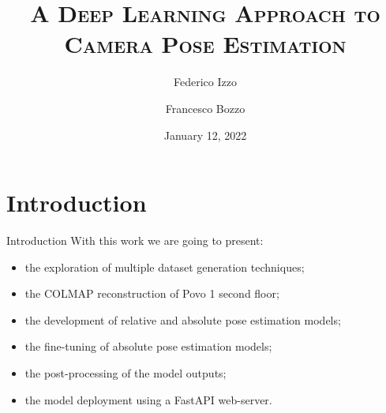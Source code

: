 \documentclass[
    center,
]{beamer}
\title[Deep Learning Camera Pose Estimation]{\textsc{A Deep Learning Approach to\\Camera Pose Estimation}}
\author[Bozzo - Izzo]{Federico Izzo \and Francesco Bozzo}
\institute[UniTN]{University of Trento}
\date{January 12, 2022}
\begin{document}
\begin{frame}
    \titlepage
\end{frame}



\section{Introduction}
\begin{frame}{Introduction}
    With this work we are going to present:
    \begin{itemize}
        \item the exploration of multiple dataset generation techniques;
        \item the COLMAP reconstruction of Povo 1 second floor;
        \item the development of relative and absolute pose estimation models;
        \item the fine-tuning of absolute pose estimation models;
        \item the post-processing of the model outputs;
        \item the model deployment using a FastAPI web-server. 
    \end{itemize}
\end{frame}
\end{document}
